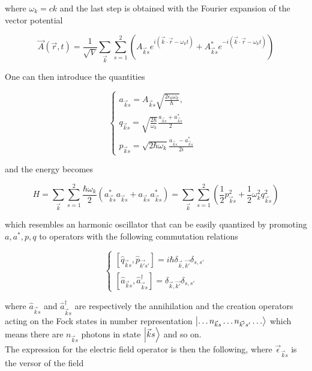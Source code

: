 \documentclass[a4paper, 11pt]{article}
\begin{document}
      where $\omega_k = ck$ and the last step is obtained with the Fourier expansion of the vector potential

      \begin{equation*}
        \vec{A}(\vec{r},t) = \frac{1}{\sqrt{V}} \sum_{\vec{k}} \sum_{s = 1}^2 \left(A_{\vec{k}s} e^{i(\vec{k}\cdot\vec{r} - \omega_kt)} + A_{\vec{k}s}^* e^{-i(\vec{k}\cdot\vec{r} - \omega_kt)} \right)
      \end{equation*}

      One can then introduce the quantities

      \begin{equation*} \label{eq:to_be_promoted}
        \begin{cases}
          a_{\vec{k}s} = A_{\vec{k}s} \sqrt{\frac{2\epsilon_0\omega_k}{\hbar}}, \qquad  \\
          q_{\vec{k}s} = \sqrt{\frac{2\hbar}{\omega_k}} \frac{a_{\vec{k}s} + a_{\vec{k}s}^*}{2} \\
          p_{\vec{k}s} = \sqrt{2\hbar\omega_k}  \frac{a_{\vec{k}s} - a_{\vec{k}s}^*}{2i}
        \end{cases}
      \end{equation*}

      and the energy becomes

      \begin{equation*}
          H = \sum_{\vec{k}} \sum_{s = 1}^2 \frac{\hbar\omega_k}{2} \left(a_{\vec{k}s}^*a_{\vec{k}s} + a_{\vec{k}s}a_{\vec{k}s}^* \right)
           = \sum_{\vec{k}} \sum_{s = 1}^2 \left(\frac{1}{2}p_{\vec{k}s}^2 + \frac{1}{2} \omega_k^2 q_{\vec{k}s}^2 \right)
      \end{equation*}

      which resembles an harmonic oscillator that can be easily quantized by promoting $a, a^*, p, q$ to operators with the following commutation relations

      \begin{equation*}
        \begin{cases}
          [\hat{q}_{\vec{k}s}, \hat{p}_{\vec{k'}s'}] = i\hbar \delta_{\vec{k},\vec{k'}} \delta_{s,s'} \\
          [\hat{a}_{\vec{k}s}, \hat{a}_{\vec{k}s}^{\dagger}] = \delta_{\vec{k},\vec{k'}} \delta_{s,s'}
        \end{cases}
      \end{equation*}

      where $\hat{a}_{\vec{k}s}$ and $\hat{a}_{\vec{k}s}^\dagger$ are respectively the annihilation and the creation operators acting on the Fock states in number representation $\ket{\dots n_{\vec{k}s} \dots n_{\vec{k'}s'} \dots}$ which means there are $n_{\vec{k}s}$ photons in state $\ket{\vec{k}s}$ and so on.\\
      The expression for the electric field operator is then the following, where $\vec{\epsilon}_{\vec{k}s}$ is the versor of the field
\end{document}
